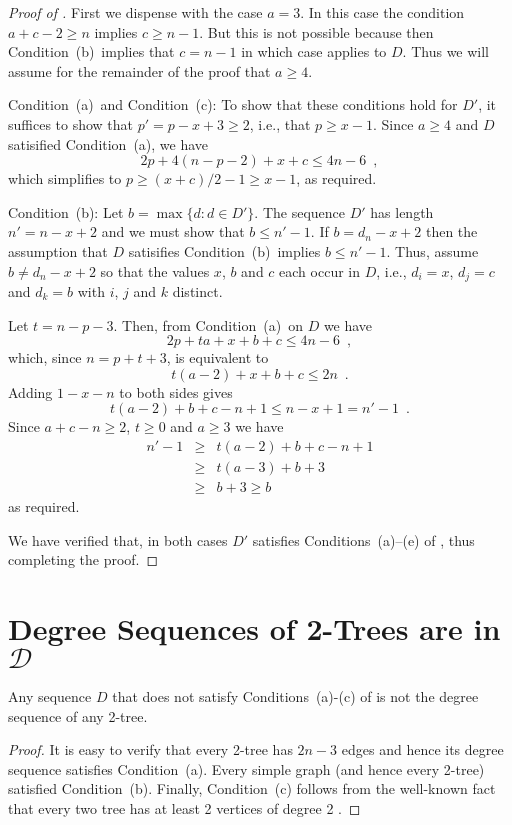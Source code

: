 \documentclass[lotsofwhite,charterfonts]{patmorin}
\newcommand{\degreesum}{Condition~(a)}
\newcommand{\maxdegree}{Condition~(b)}
\newcommand{\twotwos}{Condition~(c)}
\begin{document}
\begin{proof}[Proof of ]
First we dispense with the case $a=3$.  In this case the condition
$a+c-2\ge n$ implies $c\ge n-1$.  But this is not possible because
then \maxdegree\ implies that $c=n-1$ in which case
 applies to $D$.  Thus we will assume for the
remainder of the proof that $a\ge 4$.

\noindent\degreesum\ and \twotwos:  To show that these conditions hold
for $D'$, it suffices to show that $p'=p-x+3\ge 2$, i.e., that $p\ge
x-1$.  Since $a\ge 4$ and $D$ satisified
\degreesum, we have 
\[
             2p+4(n-p-2)+x+c \le 4n-6 \enspace ,
\]
which simplifies to $p\ge (x+c)/2-1\ge x-1$, as required.

\noindent\maxdegree:  Let $b=\max\{d:d\in D'\}$.  The sequence $D'$
has length $n'=n-x+2$ and we must show that $b\le n'-1$.  If
$b=d_n-x+2$ then the assumption that $D$ satisifies \maxdegree\
implies $b\le n'-1$.  Thus, assume $b\neq d_{n}-x+2$ so that the values
$x$, $b$ and $c$ each occur in $D$, i.e., $d_i=x$, $d_j=c$ and $d_k=b$
with $i$, $j$ and $k$ distinct.

Let $t=n-p-3$.  Then, from \degreesum\ on $D$ we have
\[
     2p + ta + x + b + c  \le 4n-6 \enspace , 
\]
which, since $n=p+t+3$, is equivalent to 
\[
     t(a-2) + x + b + c  \le 2n \enspace .
\]
Adding $1-x-n$ to both sides gives
\[
     t(a-2) + b + c - n + 1\le n - x + 1 = n' - 1\enspace .
\]
Since $a+c-n \ge 2$, $t\ge 0$ and $a\ge 3$ we have
\begin{eqnarray*}
     n'-1 & \ge & t(a-2) + b + c - n + 1 \\
          & \ge & t(a-3) + b + 3 \\
          & \ge & b+3 \ge b
\end{eqnarray*}
as required.

We have verified that, in both cases $D'$ satisfies
Conditions~(a)--(e) of , thus completing the proof.
\end{proof}


\section{Degree Sequences of 2-Trees are in $\mathcal{D}$}

\begin{lem}
Any sequence $D$ that does not satisfy Conditions~(a)-(c) of
 is not the degree sequence of any 2-tree.
\end{lem}

\begin{proof}
It is easy to verify that every 2-tree has $2n-3$ edges and hence
its degree sequence satisfies Condition~(a).
Every simple graph (and hence every 2-tree) satisfied Condition~(b).
Finally, Condition~(c) follows from the 
well-known fact that every two tree has at least 2 vertices of degree
2 \cite{X}.
\end{proof}
\end{document}
